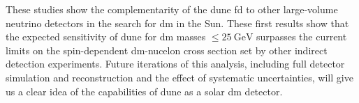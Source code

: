 These studies show the complementarity of the \gls{dune} \gls{fd} to other large-volume neutrino detectors in the search for \gls{dm} in the Sun. These first results show that the expected sensitivity of \gls{dune} for \gls{dm} masses $\leq 25 ~ \mathrm{GeV}$ surpasses the current limits on the spin-dependent \gls{dm}-nucelon cross section set by other indirect detection experiments. Future iterations of this analysis, including full detector simulation and reconstruction and the effect of systematic uncertainties, will give us a clear idea of the capabilities of \gls{dune} as a solar \gls{dm} detector.